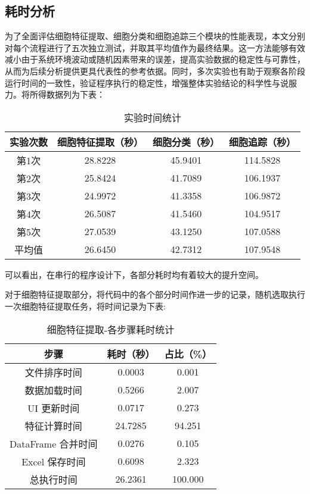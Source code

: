 \subsection{耗时分析}
为了全面评估细胞特征提取、细胞分类和细胞追踪三个模块的性能表现，本文分别对每个流程进行了五次独立测试，并取其平均值作为最终结果。这一方法能够有效减小由于系统环境波动或随机因素带来的误差，提高实验数据的稳定性与可靠性，从而为后续分析提供更具代表性的参考依据。同时，多次实验也有助于观察各阶段运行时间的一致性，验证程序执行的稳定性，增强整体实验结论的科学性与说服力。将所得数据列为下表：
\begin{table}[!htbp]
    \centering
    \caption{实验时间统计}
    \begin{tabular*}{350pt}{@{\extracolsep{\fill}}cccc}
        \toprule
        实验次数 & 细胞特征提取（秒） & 细胞分类（秒） & 细胞追踪（秒） \\
        \midrule
        第1次   & 28.8228 & 45.9401 & 114.5828 \\
        第2次   & 25.8424 & 41.7089 & 106.1937 \\
        第3次   & 24.9972 & 41.3358 & 106.9872 \\
        第4次   & 26.5087 & 41.5460 & 104.9517 \\
        第5次   & 27.0539 & 43.1250 & 107.0588 \\
        平均值   & 26.6450 & 42.7312 & 107.9548 \\
        \bottomrule
    \end{tabular*}
\end{table}

可以看出，在串行的程序设计下，各部分耗时均有着较大的提升空间。

对于细胞特征提取部分，将代码中的各个部分时间作进一步的记录，随机选取执行一次细胞特征提取任务，将时间记录为下表:

\begin{table}[!htbp]
    \centering
    \caption{细胞特征提取-各步骤耗时统计}
    \begin{tabular*}{350pt}{@{\extracolsep{\fill}}ccc}
        \toprule
        步骤             & 耗时（秒） & 占比（\%） \\
        \midrule
        文件排序时间     & 0.0003     & 0.001      \\
        数据加载时间     & 0.5266     & 2.007      \\
        UI 更新时间       & 0.0717     & 0.273      \\
        特征计算时间     & 24.7285    & 94.251     \\
        DataFrame 合并时间 & 0.0276    & 0.105      \\
        Excel 保存时间   & 0.6098     & 2.323      \\
        总执行时间       & 26.2361    & 100.000    \\
        \bottomrule
    \end{tabular*}
\end{table}

